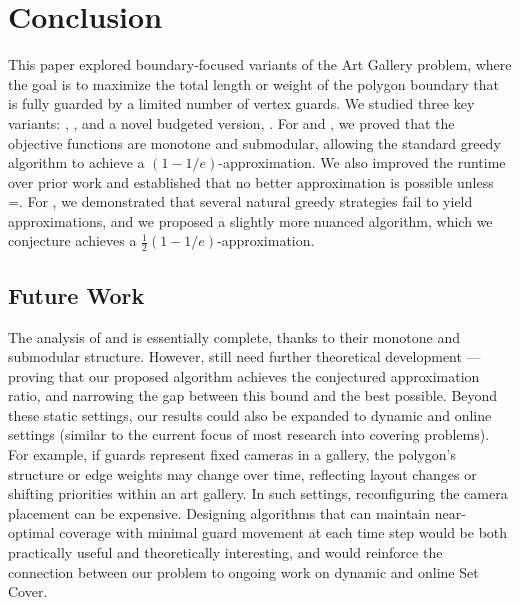 \section{Conclusion}
This paper explored boundary-focused variants of the Art Gallery problem, where the goal is to maximize the total length or weight of the polygon boundary that is fully guarded by a limited number of vertex guards. We studied three key variants: \MLVG{}, \MVVG{}, and a novel budgeted version, \BMVVG{}. For \MLVG{} and \MVVG{}, we proved that the objective functions are monotone and submodular, allowing the standard greedy algorithm to achieve a $(1-1/e)$-approximation. We also improved the runtime over prior work \cite{fragoudakis-interior} and established that no better approximation is possible unless =. For \BMVVG{}, we demonstrated that several natural greedy strategies fail to yield approximations, and we proposed a slightly more nuanced algorithm, which we conjecture achieves a $\frac{1}{2}(1-1/e)$-approximation.

\subsection{Future Work}
The analysis of \MLVG{} and \MVVG{} is essentially complete, thanks to their monotone and submodular structure. However, \BMVVG{} still need further theoretical development --- proving that our proposed algorithm achieves the conjectured approximation ratio, and narrowing the gap between this bound and the best possible. Beyond these static settings, our results could also be expanded to dynamic and online settings (similar to the current focus of most research into covering problems). For example, if guards represent fixed cameras in a gallery, the polygon's structure or edge weights may change over time, reflecting layout changes or shifting priorities within an art gallery. In such settings, reconfiguring the camera placement can be expensive. Designing algorithms that can maintain near-optimal coverage with minimal guard movement at each time step would be both practically useful and theoretically interesting, and would reinforce the connection between our problem to ongoing work on dynamic and online Set Cover.